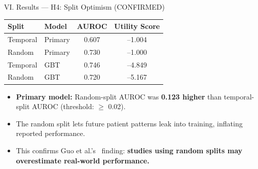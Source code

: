 \documentclass[aspectratio=169,10pt]{beamer}
\newcommand{\tablestyle}{%
  \renewcommand{\arraystretch}{1.2}%
  \small%
}
\begin{document}
\begin{frame}{VI. Results --- H4: Split Optimism {\small\color{BabyMint!60!green}(CONFIRMED)}}
\begin{center}
\tablestyle
\begin{tabular}{llcc}
\toprule
\textbf{Split} & \textbf{Model} & \textbf{AUROC} & \textbf{Utility Score} \\
\midrule
Temporal & Primary & 0.607 & --1.004 \\
Random   & Primary & 0.730 & --1.000 \\
Temporal & GBT     & 0.746 & --4.849 \\
Random   & GBT     & 0.720 & --5.167 \\
\bottomrule
\end{tabular}
\end{center}

\vspace{6pt}
\begin{itemize}
  \item \textbf{Primary model:} Random-split AUROC was \textbf{0.123 higher} than temporal-split AUROC (threshold: $\geq$ 0.02).
  \item The random split lets future patient patterns leak into training, inflating reported performance.
  \item This confirms Guo et al.'s~\cite{guo2022temporal} finding: \textbf{studies using random splits may overestimate real-world performance.}
\end{itemize}
\end{frame}
\end{document}
